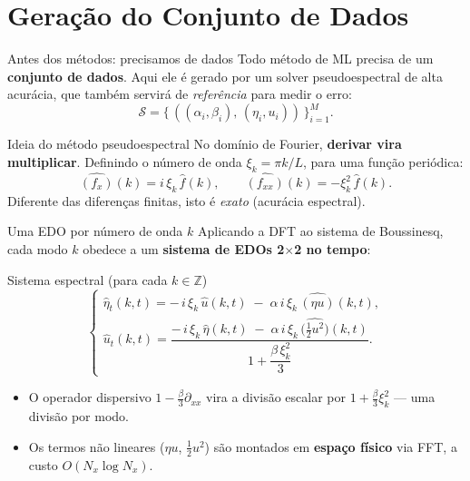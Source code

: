 \section{Geração do Conjunto de Dados}

\begin{frame}{Antes dos métodos: precisamos de dados}
  Todo método de ML precisa de um \textbf{conjunto de dados}. Aqui ele é gerado por um
  \alert{solver pseudoespectral} de alta acurácia, que também servirá de \emph{referência}
  para medir o erro:
  \begin{equation*}
    \mathcal{S} = \bigl\{\,((\alpha_i,\beta_i),\,(\eta_i,u_i))\,\bigr\}_{i=1}^{M}.
  \end{equation*}

  \begin{block}{Ideia do método pseudoespectral}
    No domínio de Fourier, \textbf{derivar vira multiplicar}. Definindo o número de onda
    $\xi_k = \pi k / L$, para uma função periódica:
    \begin{equation*}
      \widehat{(f_x)}(k) = i\,\xi_k\,\hat{f}(k),
      \qquad
      \widehat{(f_{xx})}(k) = -\xi_k^2\,\hat{f}(k).
    \end{equation*}
    Diferente das diferenças finitas, isto é \emph{exato} (acurácia espectral).
  \end{block}
\end{frame}

\begin{frame}{Uma EDO por número de onda $k$}
  Aplicando a DFT ao sistema de Boussinesq, cada modo $k$ obedece a um
  \textbf{sistema de EDOs 2$\times$2 no tempo}:
  \begin{block}{Sistema espectral (para cada $k \in \mathbb{Z}$)}
    \small
    \begin{equation*}
      \begin{cases}
        \hat{\eta}_t(k,t) = -\,i\,\xi_k\,\hat{u}(k,t) \;-\; \alpha\,i\,\xi_k\,\widehat{(\eta u)}(k,t), \\[10pt]
        \hat{u}_t(k,t) = \dfrac{-\,i\,\xi_k\,\hat{\eta}(k,t) \;-\; \alpha\,i\,\xi_k\,\widehat{\bigl(\tfrac{1}{2}u^2\bigr)}(k,t)}{1 + \dfrac{\beta\,\xi_k^2}{3}}.
      \end{cases}
    \end{equation*}
  \end{block}

  \begin{itemize}
    \item O operador dispersivo $1-\tfrac{\beta}{3}\partial_{xx}$ vira a \alert{divisão escalar}
          por $1+\tfrac{\beta}{3}\xi_k^2$ --- uma divisão por modo.
    \item Os termos não lineares ($\eta u$, $\tfrac{1}{2}u^2$) são montados em
          \textbf{espaço físico} via FFT, a custo $O(N_x \log N_x)$.
  \end{itemize}
\end{frame}

